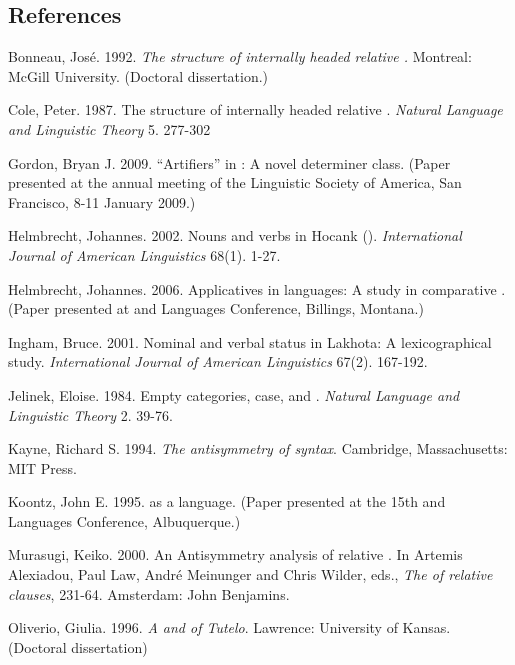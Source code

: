 \begin{refsection}
\section*{References}
 

\printbibliography[heading=subbibliography,notkeyword=this]
\begin{reflist}

Bonneau, Jos\'e. 1992. \textit{The structure of internally headed relative .} Montreal: McGill University. (Doctoral dissertation.) 

Cole, Peter. 1987. The structure of internally headed relative . \textit{Natural Language and Linguistic Theory} 5. 277-302

Gordon, Bryan J. 2009. ``Artifiers'' in : A novel determiner class. (Paper presented at the annual meeting of the Linguistic Society of America, San Francisco, 8-11 January 2009.)

Helmbrecht, Johannes. 2002. Nouns and verbs in Hocank (). \textit{International Journal of American Linguistics} 68(1). 1-27.

Helmbrecht, Johannes. 2006. Applicatives in  languages: A study in comparative  . (Paper presented at  and  Languages Conference, Billings, Montana.)

Ingham, Bruce. 2001. Nominal and verbal status in Lakhota: A lexicographical study. \textit{International Journal of American Linguistics} 67(2). 167-192.

Jelinek, Eloise. 1984. Empty categories, case, and . \textit{Natural Language and Linguistic Theory} 2. 39-76.

Kayne, Richard S. 1994. \textit{The antisymmetry of syntax}. Cambridge, Massachusetts: MIT Press.
                 
Koontz, John E. 1995.  as a  language. (Paper presented at the 15th  and  Languages Conference, Albuquerque.)

Murasugi, Keiko. 2000. An Antisymmetry analysis of  relative . In Artemis Alexiadou, Paul Law, Andr\'e Meinunger and Chris Wilder, eds., \textit{The  of relative clauses}, 231-64. Amsterdam: John Benjamins. 

Oliverio, Giulia. 1996. \textit{A  and  of Tutelo}. Lawrence: University of Kansas. (Doctoral dissertation)


\end{reflist}
\end{refsection}

